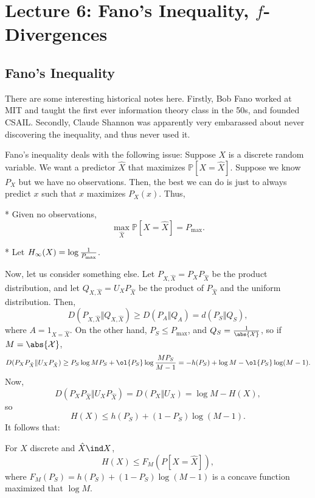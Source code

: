 \section*{Lecture 6: Fano's Inequality, $f$-Divergences}
\setcounter{section}{6}

\subsection{Fano's Inequality}

There are some interesting historical notes here. 
Firstly, Bob Fano worked at MIT and taught the first ever information theory class in the 50s, and founded CSAIL.
Secondly, Claude Shannon was apparently very embarassed about never discovering the inequality, and thus never used it.

Fano's inequality deals with the following issue: Suppose $X$ is a discrete random variable. We want a predictor $\hat X$ that maximizes $\mathbb P[X = \hat X]$.
Suppose we know $P_X$ but we have no observations. 
Then, the best we can do is just to always predict $x$ such that $x$ maximizes $P_X(x)$.
Thus, 

\begin{fact}*
	Given no observations, 
	\[
		\max\limits_{\hat X} \mathbb P[X = \hat X] = P_{\text{max}}.
	\]
\end{fact}

\begin{defn}*
	Let $H_\infty(X) = \log \frac 1{P_{\textnormal{max}}}$.
\end{defn}

Now, let us consider something else. Let $P_{X,\hat X} = P_XP_{\hat X}$ be the product distribution, and let $Q_{X, \hat X} = U_X P_{\hat X}$ be the product of $P_{\hat X}$ and the uniform distribution.
Then, \[
	D(P_{X,\hat X}\Vert Q_{X,\hat X}) \geq D(P_A \Vert Q_A) = d(P_S \Vert Q_S),
\]
where $A = 1_{X = \hat X}$.
On the other hand, $P_S \leq P_{\text{max}}$, and $Q_S = \frac 1{\abs{\mathcal X}}$, so if $M = \abs{\mathcal X}$,\[
	D(P_XP_{\hat X} \Vert U_XP_{\hat X}) \geq P_S \log MP_S + \ol{P_S} \log \frac{MP_S}{M-1} = -h(P_S) + \log M - \ol{P_S} \log (M-1).
\]
Now, \[
	D(P_XP_{\hat X} \Vert U_X P_{\hat X}) = D(P_X \Vert U_X) = \log M - H(X),
\]
so \[
	H(X) \leq h(P_S) + (1-P_S) \log (M-1).
\]
It follows that: 

\begin{fact}
	For $X$ discrete and $\hat X \ind X$, \[
		H(X) \leq F_M(P[X = \hat X]),
	\]
	where $F_M(P_S) = h(P_S) + (1-P_S) \log (M-1)$ is a concave function maximized that $\log M$.
\end{fact}	

